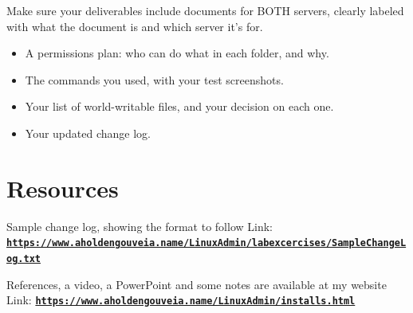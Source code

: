 \documentclass[12pt]{article}
\begin{document}
Make sure your deliverables include documents for BOTH servers, clearly labeled with what the document is and which server it's for.
\begin{itemize}
    \item A permissions plan: who can do what in each folder, and why.
    \item The commands you used, with your test screenshots.
    \item Your list of world-writable files, and your decision on each one.
    \item Your updated change log.
\end{itemize}

\section*{Resources}
Sample change log, showing the format to follow
Link: \href{https://www.aholdengouveia.name/LinuxAdmin/labexcercises/SampleChangeLog.txt}{\textbf{\nolinkurl{https://www.aholdengouveia.name/LinuxAdmin/labexcercises/SampleChangeLog.txt}}}

References, a video, a PowerPoint and some notes are available at my website
Link: \href{https://www.aholdengouveia.name/LinuxAdmin/installs.html}{\textbf{\nolinkurl{https://www.aholdengouveia.name/LinuxAdmin/installs.html}}}

\end{document}
